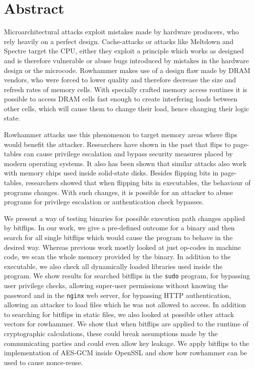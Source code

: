 
{}
\chapter*{Abstract}
\label{cha:abstract}

Microarchitectural attacks exploit mistakes made by hardware producers, who rely
heavily on a perfect design. Cache-attacks or attacks like Meltdown and Spectre
target the CPU, either they exploit a principle which works as designed and is
therefore vulnerable or abuse bugs introduced by mistakes in the hardware
design or the microcode. Rowhammer makes use of a design flaw made by DRAM
vendors, who were forced to lower quality and therefore decrease the size and
refresh rates of memory cells. With specially crafted memory access routines it
is possible to access DRAM cells fast enough to create interfering loads between
other cells, which will cause them to change their load, hence changing their
logic state.

Rowhammer attacks use this phenomenon to target memory areas where flips would
benefit the attacker. Researchers have shown in the past that flips to
page-tables can cause privilege escalation and bypass security measures placed
by modern operating systems. It also has been shown that similar attacks also
work with memory chips used inside solid-state disks. Besides flipping bits in
page-tables, researchers showed that when flipping bits in executables, the
behaviour of programs changes. With such changes, it is possible for an attacker
to abuse programs for privilege escalation or authentication check bypasses.

We present a way of testing binaries for possible execution path changes applied
by bitflips. In our work, we give a pre-defined outcome for a binary and then
search for all single bitflips which would cause the program to behave in the
desired way. Whereas previous work mostly looked at just op-codes in machine
code, we scan the whole memory provided by the binary. In addition to the
executable, we also check all dynamically loaded libraries used inside the
program. We show results for searched bitflips in the \texttt{sudo} program, for
bypassing user privilege checks, allowing super-user permissions without knowing
the password and in the \texttt{nginx} web server, for bypassing HTTP
authentication, allowing an attacker to load files which he was not allowed to
access. In addition to searching for bitflips in static files, we also looked at
possible other attack vectors for rowhammer. We show that when bitflips are
applied to the runtime of cryptographic calculations, these could break
assumptions made by the communicating parties and could even allow key leakage.
We apply bitflips to the implementation of AES-GCM inside OpenSSL and show how
rowhammer can be used to cause nonce-reuse.

